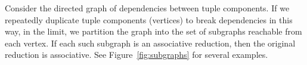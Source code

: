 Consider the directed graph of dependencies between tuple components. If we repeatedly duplicate tuple components (vertices) to break dependencies in this way, in the limit, we partition the graph into the set of subgraphs reachable from each vertex. If each such subgraph is an associative reduction, then the original reduction is associative. See Figure~\ref{fig:subgraphs} for several examples.





